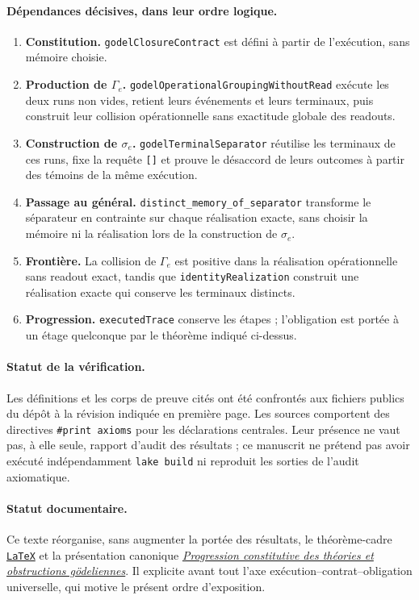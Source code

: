 \documentclass[11pt,a4paper]{article}
\newcommand{\code}[1]{\nolinkurl{#1}}
\newcommand{\Source}[2]{\href{https://github.com/JohnDoe-collab-stack/relational-perimeter/blob/1e5aeda745559d62a3819bb3213da7fce3c31ad1/#1}{\nolinkurl{#2}}}
\theoremstyle{remark}
\begin{document}
\paragraph{Dépendances décisives, dans leur ordre logique.}
\begin{enumerate}[leftmargin=*,itemsep=3pt]
\item \textbf{Constitution.} \code{godelClosureContract} est défini à partir de l'exécution, sans mémoire choisie.
\item \textbf{Production de $\Gamma_e$.} \code{godelOperationalGroupingWithoutRead} exécute les deux runs non vides, retient leurs événements et leurs terminaux, puis construit leur collision opérationnelle sans exactitude globale des readouts.
\item \textbf{Construction de $\sigma_e$.} \code{godelTerminalSeparator} réutilise les terminaux de ces runs, fixe la requête \code{[]} et prouve le désaccord de leurs outcomes à partir des témoins de la même exécution.
\item \textbf{Passage au général.} \code{distinct_memory_of_separator} transforme le séparateur en contrainte sur chaque réalisation exacte, sans choisir la mémoire ni la réalisation lors de la construction de $\sigma_e$.
\item \textbf{Frontière.} La collision de $\Gamma_e$ est positive dans la réalisation opérationnelle sans readout exact, tandis que \code{identityRealization} construit une réalisation exacte qui conserve les terminaux distincts.
\item \textbf{Progression.} \code{executedTrace} conserve les étapes ; l'obligation est portée à un étage quelconque par le théorème indiqué ci-dessus.
\end{enumerate}

\paragraph{Statut de la vérification.}
Les définitions et les corps de preuve cités ont été confrontés aux fichiers
publics du dépôt à la révision indiquée en première page. Les sources
comportent des directives \texttt{\#print axioms} pour les déclarations
centrales. Leur présence ne vaut pas, à elle seule, rapport d'audit des
résultats ; ce manuscrit ne prétend pas avoir exécuté indépendamment
\texttt{lake build} ni reproduit les sorties de l'audit axiomatique.

\paragraph{Statut documentaire.}
Ce texte réorganise, sans augmenter la portée des résultats, le théorème-cadre
\Source{docs/theoreme-cadre-progression-godelienne-separation-exacte.fr.tex}{LaTeX}
et la présentation canonique
\href{https://github.com/JohnDoe-collab-stack/relational-perimeter/blob/1e5aeda745559d62a3819bb3213da7fce3c31ad1/docs/progression-constitutive-theories-godeliennes.fr.md}{\emph{Progression constitutive des théories et obstructions gödeliennes}}.
Il explicite avant tout l'axe exécution--contrat--obligation universelle,
qui motive le présent ordre d'exposition.
\end{document}
